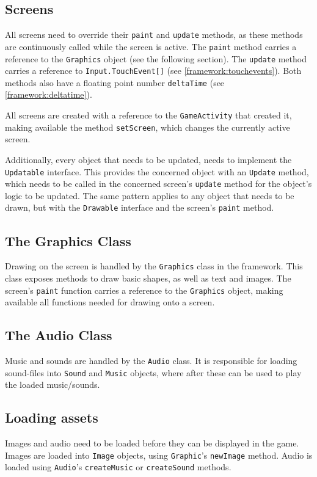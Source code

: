 \subsection{Screens}
All screens need to override their \lstinline|paint| and \lstinline|update| methods, as these methods are continuously called while the screen is active.
The \lstinline|paint| method carries a reference to the \lstinline|Graphics| object (see the following section).
The \lstinline|update| method carries a reference to \lstinline|Input.TouchEvent[]| (see \cref{framework:touchevents}).
Both methods also have a floating point number \lstinline|deltaTime| (see \cref{framework:deltatime}).

All screens are created with a reference to the \lstinline|GameActivity| that created it, making available the method \lstinline|setScreen|, which changes the currently active screen.

Additionally, every object that needs to be updated, needs to implement the \lstinline|Updatable| interface.
This provides the concerned object with an \lstinline|Update| method, which needs to be called in the concerned screen's \lstinline|update| method for the object's logic to be updated.
The same pattern applies to any object that needs to be drawn, but with the \lstinline|Drawable| interface and the screen's \lstinline|paint| method.

\subsection{The Graphics Class}
Drawing on the screen is handled by the \lstinline|Graphics| class in the framework.
This class exposes methods to draw basic shapes, as well as text and images.
The screen's \lstinline|paint| function carries a reference to the \lstinline|Graphics| object, making available all functions needed for drawing onto a screen.

\subsection{The Audio Class}
Music and sounds are handled by the \lstinline|Audio| class.
It is responsible for loading sound-files into \lstinline|Sound| and \lstinline|Music| objects, where after these can be used to play the loaded music/sounds.

\subsection{Loading assets}
Images and audio need to be loaded before they can be displayed in the game.
Images are loaded into \lstinline|Image| objects, using \lstinline|Graphic|'s \lstinline|newImage| method.
Audio is loaded using \lstinline|Audio|'s \lstinline|createMusic| or \lstinline|createSound| methods.

